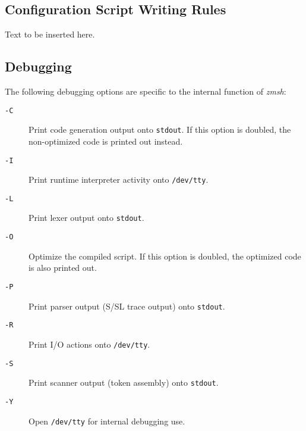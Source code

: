 




\subsection{Configuration Script Writing Rules}

Text to be inserted here.




\subsection{Debugging}



The following debugging options are specific to the internal 
function of {\em zmsh}: 
\begin{description}
\item[{\tt -C}] \mbox{}

Print code generation output onto 
{\tt stdout}. If this option is doubled, the non-optimized 
code is printed out instead. 

\item[{\tt -I}] \mbox{}

Print runtime interpreter activity onto 
{\tt /dev/tty}. 

\item[{\tt -L}] \mbox{}

Print lexer output onto {\tt stdout}. 

\item[{\tt -O}] \mbox{}

Optimize the compiled script. If this 
option is doubled, the optimized code is also printed out. 

\item[{\tt -P}] \mbox{}

Print parser output (S/SL trace output) 
onto {\tt stdout}. 

\item[{\tt -R}] \mbox{}

Print I/O actions onto {\tt /dev/tty}. 

\item[{\tt -S}] \mbox{}

Print scanner output (token assembly) 
onto {\tt stdout}. 

\item[{\tt -Y}] \mbox{}

Open {\tt /dev/tty} for internal 
debugging use. 

\end{description}





